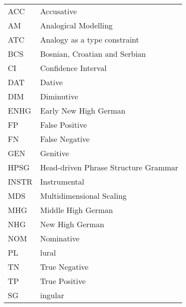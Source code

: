 \addchap{\lsAbbreviationsTitle}

\begin{tabularx}{.45\textwidth}{lQ}
    ACC   & Accusative                           \\
    AM    & Analogical Modelling                 \\
    ATC   & Analogy as a type constraint         \\
    BCS   & Bosnian, Croatian and Serbian        \\
    CI    & Confidence Interval                  \\
    DAT   & Dative                               \\
    DIM   & Diminutive                           \\
    ENHG  & Early New High German                \\
    FP    & False Positive                       \\
    FN    & False Negative                       \\
    GEN   & Genitive                             \\
    HPSG  & Head-driven Phrase Structure Grammar \\
    INSTR & Instrumental                         \\
    MDS   & Multidimensional Scaling             \\
    MHG   & Middle High German                   \\
    NHG   & New High German                      \\
    NOM   & Nominative                           \\
    PL    & lural                                \\
    TN    & True Negative                        \\
    TP    & True Positive                        \\
    SG    & ingular                              \\
\end{tabularx}
